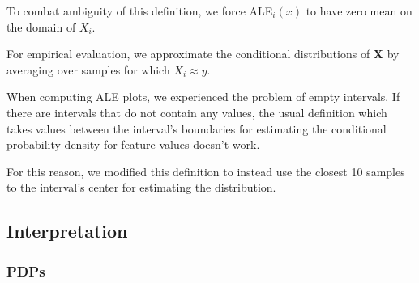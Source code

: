 \documentclass[10pt,sigconf,letterpaper]{acmart}
\begin{document}
To combat ambiguity of this definition, we force ALE$_i(x)$ to have zero mean on the domain of $X_i$.

For empirical evaluation, we approximate the conditional distributions of $\boldsymbol X$ by averaging over samples for which $X_i \approx y$. 

When computing ALE plots, we experienced the problem of empty intervals. If there are intervals  that do not contain any values, the usual definition which takes values between the interval's boundaries for estimating the conditional probability density for feature values doesn't work. 

For this reason, we modified this definition to instead use the closest 10 samples to the interval's center for estimating the distribution.

\subsection{Interpretation}
\subsubsection{PDPs}
\end{document}
